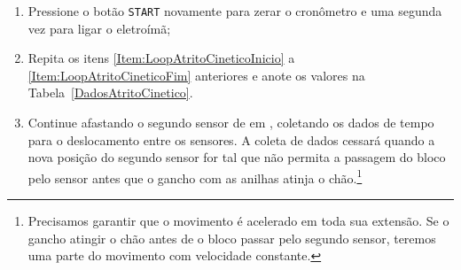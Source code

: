 \begin{enumerate}
    \item Pressione o botão \texttt{START} novamente para zerar o cronômetro e uma segunda vez para ligar o eletroímã;
    \item Repita os itens \ref{Item:LoopAtritoCineticoInicio} a \ref{Item:LoopAtritoCineticoFim} anteriores e anote os valores na Tabela~\ref{DadosAtritoCinetico}.
    \item Continue afastando o segundo sensor de  em , coletando os dados de tempo para o deslocamento entre os sensores. A coleta de dados cessará quando a nova posição do segundo sensor for tal que não permita a passagem do bloco pelo sensor antes que o gancho com as anilhas atinja o chão.\footnote{Precisamos garantir que o movimento é acelerado em toda sua extensão. Se o gancho atingir o chão antes de o bloco passar pelo segundo sensor, teremos uma parte do movimento com velocidade constante.}
\end{enumerate}

\cleardoublepage


\vspace{15mm}

\begin{fullwidth}
\noindent{}
\vspace{5mm}

\noindent{}

\noindent{}

\noindent{}

\noindent{}

\noindent{}
\end{fullwidth}

